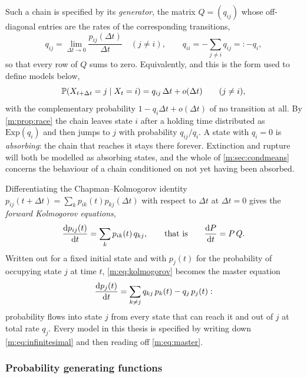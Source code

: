 Such a chain is specified by its \emph{generator}, the matrix $Q = (q_{ij})$ whose
off-diagonal entries are the rates of the corresponding transitions,
\begin{equation}
\label{m:eq:generator}
q_{ij} = \lim_{\Delta t\to0}\frac{p_{ij}(\Delta t)}{\Delta t}\quad(j\neq i),
\qquad
q_{ii} = -\sum_{j\neq i}q_{ij} =: -q_i ,
\end{equation}
so that every row of $Q$ sums to zero. Equivalently, and this is the form used to
define models below,
\begin{equation}
\label{m:eq:infinitesimal}
\mathbb{P}\!\left(X_{t+\Delta t} = j \mid X_t = i\right) = q_{ij}\,\Delta t + o(\Delta t)
\qquad (j \neq i),
\end{equation}
with the complementary probability $1-q_i\Delta t + o(\Delta t)$ of no transition
at all. By \cref{m:prop:race} the chain leaves state $i$ after a holding time
distributed as $\mathrm{Exp}(q_i)$ and then jumps to $j$ with probability
$q_{ij}/q_i$. A state with $q_i=0$ is \emph{absorbing}: the chain that reaches it
stays there forever. Extinction and rupture will both be modelled as absorbing
states, and the whole of \cref{m:sec:condmeans} concerns the behaviour of a chain
conditioned on not yet having been absorbed.

Differentiating the Chapman--Kolmogorov identity
$p_{ij}(t+\Delta t) = \sum_k p_{ik}(t)p_{kj}(\Delta t)$ with respect to $\Delta t$
at $\Delta t=0$ gives the \emph{forward Kolmogorov equations},
\begin{equation}
\label{m:eq:kolmogorov}
\frac{\mathrm{d} p_{ij}(t)}{\mathrm{d} t} = \sum_{k} p_{ik}(t)\,q_{kj},
\qquad\text{that is}\qquad
\frac{\mathrm{d} P}{\mathrm{d} t} = P\,Q .
\end{equation}
Written out for a fixed initial state and with $p_j(t)$ for the probability of
occupying state $j$ at time $t$, \cref{m:eq:kolmogorov} becomes the master equation
\begin{equation}
\label{m:eq:master}
\frac{\mathrm{d} p_j(t)}{\mathrm{d} t} = \sum_{k\neq j}q_{kj}\,p_k(t) - q_j\,p_j(t):
\end{equation}
probability flows into state $j$ from every state that can reach it and out of $j$
at total rate $q_j$. Every model in this thesis is specified by writing down
\cref{m:eq:infinitesimal} and then reading off \cref{m:eq:master}.


\subsubsection{Probability generating functions}
\label{m:sec:pgf}

